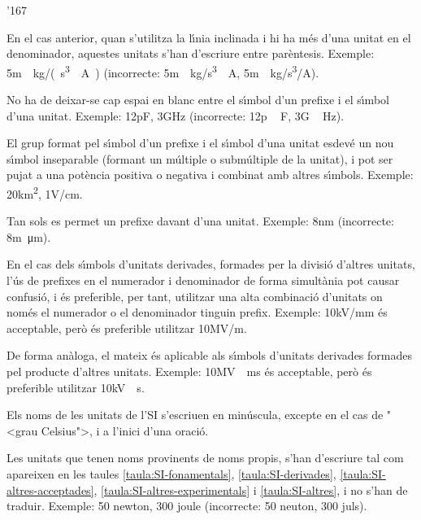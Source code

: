 \begin{dinglist}{'167}
\item En el cas anterior, quan s'utilitza la l\'{\i}nia inclinada i hi ha m\'{e}s
d'una unitat en el denominador, aquestes unitats s'han d'escriure
entre par\`{e}ntesis. Exemple: 5\unit{m\cdot kg/(s^3\cdot A)}
(incorrecte: 5\unit{m\cdot kg/s^3\cdot A}, 5\unit{m\cdot kg/s^3/
A}).

\item No ha de deixar-se cap espai en blanc entre el s\'{\i}mbol d'un prefixe i
el s\'{\i}mbol d'una unitat. Exemple: 12\unit{pF}, 3\unit{GHz}
(incorrecte: 12\unit{p\,F}, 3\unit{G\,Hz}).

\item El grup format pel s\'{\i}mbol d'un prefixe i el s\'{\i}mbol d'una unitat
esdev\'{e} un nou s\'{\i}mbol inseparable (formant un m\'{u}ltiple o subm\'{u}ltiple
de la unitat), i pot ser pujat a una pot\`{e}ncia positiva o negativa i
combinat amb altres s\'{\i}mbols. Exemple: 20\unit{km^2}, 1\unit{V/cm}.

\item Tan sols es permet un prefixe davant d'una unitat. Exemple:
8\unit{nm} (incorrecte: 8\unit{m\micro m}).

\item En el cas dels s\'{\i}mbols d'unitats derivades, formades per la divisi\'{o}
d'altres unitats, l'\'{u}s de prefixes en el numerador i denominador de
forma simult\`{a}nia pot causar confusi\'{o}, i \'{e}s preferible, per tant,
utilitzar una alta combinaci\'{o} d'unitats on nom\'{e}s el numerador o el
denominador tinguin prefix. Exemple: 10\unit{kV/mm} \'{e}s acceptable,
per\`{o} \'{e}s preferible utilitzar 10\unit{MV/m}.

\item De forma an\`{a}loga, el mateix \'{e}s aplicable als s\'{\i}mbols d'unitats
derivades formades pel producte d'altres unitats.  Exemple:
10\unit{MV\cdot ms} \'{e}s acceptable, per\`{o} \'{e}s preferible utilitzar
10\unit{kV\cdot s}.

\item Els noms de les unitats de l'SI s'escriuen en min\'{u}scula, excepte en
el cas de {"<}grau Celsius{">}, i a l'inici d'una oraci\'{o}.

\item Les unitats que tenen noms provinents de noms propis, s'han
d'escriure tal com apareixen en les taules
\vref{taula:SI-fonamentals}, \vref{taula:SI-derivades}, \vref{taula:SI-altres-acceptades}, \vref{taula:SI-altres-experimentals} i \vref{taula:SI-altres}, i no s'han
de traduir. Exemple: 50 newton, 300 joule (incorrecte: 50 neuton,
300 juls).



\end{dinglist}
